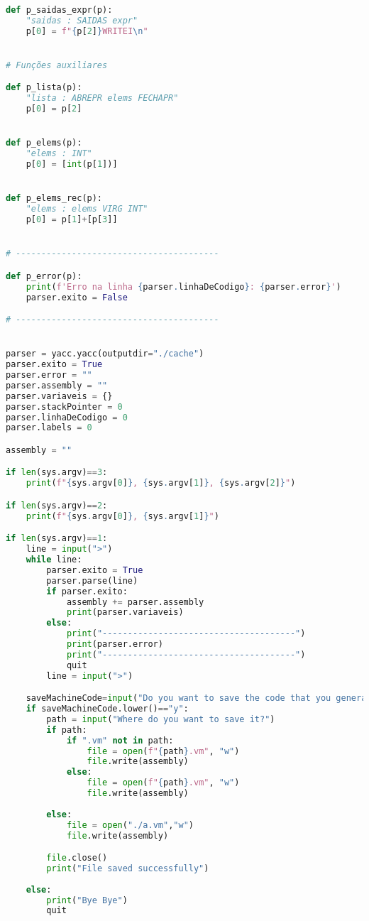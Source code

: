 \documentclass[11pt,a4paper]{report}%
\begin{document}
\begin{scriptsize}
\begin{lstlisting}[language=python]
def p_saidas_expr(p):
    "saidas : SAIDAS expr"
    p[0] = f"{p[2]}WRITEI\n"


# Funções auxiliares

def p_lista(p):
    "lista : ABREPR elems FECHAPR"
    p[0] = p[2]


def p_elems(p):
    "elems : INT"
    p[0] = [int(p[1])]


def p_elems_rec(p):
    "elems : elems VIRG INT"
    p[0] = p[1]+[p[3]]


# ----------------------------------------

def p_error(p):
    print(f'Erro na linha {parser.linhaDeCodigo}: {parser.error}')
    parser.exito = False

# ----------------------------------------


parser = yacc.yacc(outputdir="./cache")
parser.exito = True
parser.error = ""
parser.assembly = ""
parser.variaveis = {}
parser.stackPointer = 0
parser.linhaDeCodigo = 0
parser.labels = 0

assembly = ""

if len(sys.argv)==3:
    print(f"{sys.argv[0]}, {sys.argv[1]}, {sys.argv[2]}")

if len(sys.argv)==2:
    print(f"{sys.argv[0]}, {sys.argv[1]}")

if len(sys.argv)==1:
    line = input(">")
    while line:
        parser.exito = True
        parser.parse(line)
        if parser.exito:
            assembly += parser.assembly
            print(parser.variaveis)
        else:
            print("--------------------------------------")
            print(parser.error)
            print("--------------------------------------")
            quit
        line = input(">")

    saveMachineCode=input("Do you want to save the code that you generated?[y/n]")
    if saveMachineCode.lower()=="y":
        path = input("Where do you want to save it?")
        if path:
            if ".vm" not in path:
                file = open(f"{path}.vm", "w")
                file.write(assembly)
            else:
                file = open(f"{path}.vm", "w")
                file.write(assembly)
            
        else:
            file = open("./a.vm","w")
            file.write(assembly)

        file.close()
        print("File saved successfully")
        
    else:
        print("Bye Bye")
        quit

\end{lstlisting}
\end{scriptsize}
\end{document}
